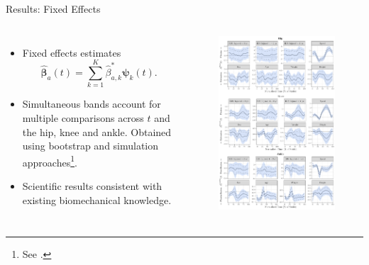 \documentclass[aspectratio=128,xcolor=dvipsnames, notes]{beamer}
\newcommand{\1}{\mathbf{1}}
\newcommand{\boldbeta}{\boldsymbol{\beta}}
\begin{document}
\begin{frame}{Results: Fixed Effects}

    \begin{columns}[c]
    \small
    \begin{itemize}
        \item Fixed effects estimates $$\widehat{\boldbeta}_a(t) = \sum_{k=1}^K \widehat{\beta}_{a, k}^* \boldsymbol{\psi}_k (t).$$
        \item Simultaneous bands account for multiple comparisons across $t$ and the hip, knee and ankle. Obtained using bootstrap and simulation approaches\footnote{\scriptsize See \textcite{faraway_regression_1997, ruppert_semiparametric_2003, crainiceanu_bootstrap-based_2012, park_simple_2018, cui_fast_2022}.}.
        \item Scientific results consistent with existing biomechanical knowledge.
    \end{itemize}
    \begin{figure}
    \centering
    \includegraphics[width=1\linewidth]{figures/fixef_coef_plot.pdf}
\end{figure}
    \end{columns}
\end{frame}
\end{document}
